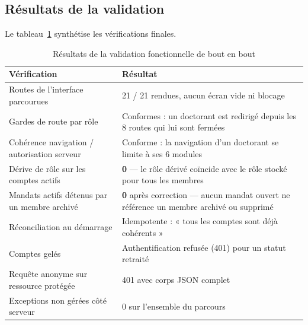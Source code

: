\subsection{Résultats de la validation}

Le tableau~\ref{tab:e2e} synthétise les vérifications finales.

\begin{table}[H]
\centering
\caption{Résultats de la validation fonctionnelle de bout en bout}
\label{tab:e2e}
\small
\begin{tabularx}{\textwidth}{@{}p{6.2cm}X@{}}
\toprule
\textbf{Vérification} & \textbf{Résultat} \\
\midrule
Routes de l'interface parcourues & 21 / 21 rendues, aucun écran vide ni blocage \\
Gardes de route par rôle & Conformes : un doctorant est redirigé depuis les 8 routes qui lui sont fermées \\
Cohérence navigation / autorisation serveur & Conforme : la navigation d'un doctorant se limite à ses 6 modules \\
Dérive de rôle sur les comptes actifs & \textbf{0} --- le rôle dérivé coïncide avec le rôle stocké pour tous les membres \\
Mandats actifs détenus par un membre archivé & \textbf{0} après correction --- aucun mandat ouvert ne référence un membre archivé ou supprimé \\
Réconciliation au démarrage & Idempotente : « tous les comptes sont déjà cohérents » \\
Comptes gelés & Authentification refusée (401) pour un statut retraité \\
Requête anonyme sur ressource protégée & 401 avec corps JSON complet \\
Exceptions non gérées côté serveur & 0 sur l'ensemble du parcours \\
\bottomrule
\end{tabularx}
\end{table}
